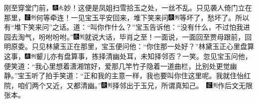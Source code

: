 刚至穿堂门前，{\includegraphics[width=3mm]{../Images/00004}\includegraphics[width=3mm]{../Images/00012}\footnotesize \kaishu 妙！这便是凤姐扫雪拾玉之处，一丝不乱。}只见袭人倚门立在那里，{\includegraphics[width=3mm]{../Images/00006}\includegraphics[width=3mm]{../Images/00011}\footnotesize \kaishu 何等牵连！}一见宝玉平安回来，堆下笑来问{\includegraphics[width=3mm]{../Images/00004}\includegraphics[width=3mm]{../Images/00011}\footnotesize \kaishu 等坏了，愁坏了。所以有“堆下笑来问”之话。}道：“叫你作什么？”宝玉告诉他：“没有什么，不过怕我进园去淘气，吩咐吩咐。”{\includegraphics[width=3mm]{../Images/00004}\includegraphics[width=3mm]{../Images/00011}\footnotesize \kaishu 就说大话，毕肖之至！}一面说，一面回至贾母跟前，回明原委。只见林黛玉正在那里，宝玉便问他：“你住那一处好？”林黛玉正心里盘算这事，{\includegraphics[width=3mm]{../Images/00004}\includegraphics[width=3mm]{../Images/00011}\footnotesize \kaishu 颦儿亦有盘算事，拣择清幽处耳，未知择邻否？一笑。}忽见宝玉问他，便笑道：“我心里想着潇湘馆好，爱那几竿竹子隐着一道曲栏，比别处更觉幽静。”宝玉听了拍手笑道：“正和我的主意一样，我也要叫你住这里呢。我就住怡红院，咱们两个又近，又都清幽。”{{\includegraphics[width=3mm]{../Images/00004}\includegraphics[width=3mm]{../Images/00011}\footnotesize \kaishu 择邻出于玉兄，所谓真知己。　}\includegraphics[width=3mm]{../Images/00006}\includegraphics[width=3mm]{../Images/00011}\footnotesize \kaishu 作后文无限张本。}


